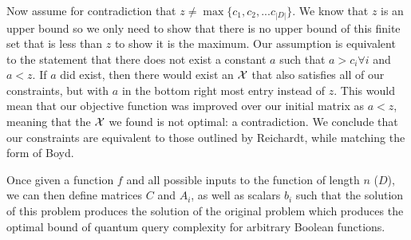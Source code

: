 Now assume for contradiction that $z \ne  \max\{c_1, c_2, ...
c_{|D|}\}$. We know that $z$ is an upper bound so we only need to
show that there is no upper bound of this finite set that is less
than $z$ to show it is the maximum. Our assumption is equivalent to
the statement that there does not exist a constant $a$ such that $a
> c_i \forall i$ and $a < z$. If $a$ did exist, then there would
exist an $\operatorname{\mathcal{X}}$ that also satisfies all of our constraints,
but with $a$ in the bottom right most entry instead of $z$. This
would mean that our objective function was improved over our
initial matrix as $a < z$, meaning that the $\operatorname{\mathcal{X}}$ we found
is not optimal: a contradiction. We conclude that our constraints
are equivalent to those outlined by Reichardt, while matching the
form of Boyd.

Once given a function $f$ and all possible inputs to the
function of length $n$ ($D$), we can then define matrices $C$ and
$A_i$, as well as scalars $b_i$ such that the solution of this
problem produces the solution of the original problem which
produces the optimal bound of quantum query complexity for
arbitrary Boolean functions.